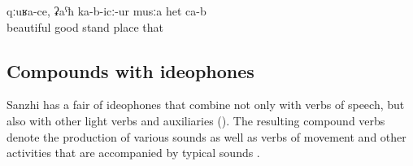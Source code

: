 \begin{exe}
	\ex	\label{ex:This is a beautiful, pleasant place}
	\gll	qːuʁa-ce,	ʡaˁħ	ka-b-icː-ur	musːa	het	ca-b\\
		beautiful	good	stand	place	that	\\
	\glt	{}
	

\end{exe}



\subsection{Compounds with ideophones}
\label{ssec:compoundswithideophones}

Sanzhi has a fair  of ideophones that combine not only with verbs of speech, but also with other light verbs and auxiliaries (). The resulting compound verbs denote the production of various sounds as well as verbs of movement and other activities that are accompanied by typical sounds .

